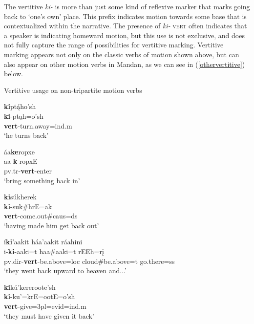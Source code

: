 The vertitive \textit{ki-} is more than just some kind of reflexive marker that marks going back to `one's own' place. This prefix indicates motion towards some base that is contextualized within the narrative. The presence of \textit{ki-} \textsc{vert} often indicates that a speaker is indicating homeward motion, but this use is not exclusive, and does not fully capture the range of possibilities for vertitive marking. Vertitive marking appears not only on the classic verbs of motion shown above, but can also appear on other motion verbs in Mandan, as we can see in (\ref{othervertitive}) below.

\begin{exe}
\item\label{othervertitive} Vertitive usage on non-tripartite motion verbs

	\begin{xlist}
	
	\item \glll \textbf{ki}ptą́ho'sh\\
	\textbf{ki}-ptąh=o'sh\\
	\textbf{vert}-\textnormal{turn.away}=ind.m\\
	\glt `he turns back' \citep[155]{hollow1970}
	
	\item \glll áa\textbf{ke}ropxe\\
	aa-\textbf{k}-ropxE\\
	pv.tr-\textbf{vert}-\textnormal{enter}\\
	\glt `bring something back in' \citep[189]{hollow1970}
	
	\item \glll \textbf{ki}súkherek\\
	\textbf{ki}-suk\#hrE=ak\\
	\textbf{vert}-\textnormal{come.out}\#caus=ds\\
	\glt `having made him get back out' \cite[144]{hollow1973a}
	
	\item \glll í\textbf{ki}'aakit háa'aakit ráahini\\
	i-\textbf{ki}-aaki=t haa\#aaki=t rEEh=rį\\
	pv.dir-\textbf{vert}-\textnormal{be.above}=loc \textnormal{cloud}\#\textnormal{be.above}=t \textnormal{go.there}=ss\\
	\glt `they went back upward to heaven and...' \citep[153]{hollow1973a}
	
	\item \glll \textbf{ki}kú'kereroote'sh\\
	\textbf{ki}-ku'=krE=ootE=o'sh\\
	\textbf{vert}-\textnormal{give}=3pl=evid=ind.m\\
	\glt `they must have given it back' \citep[474]{hollow1970}
	

\end{xlist}
\end{exe}

